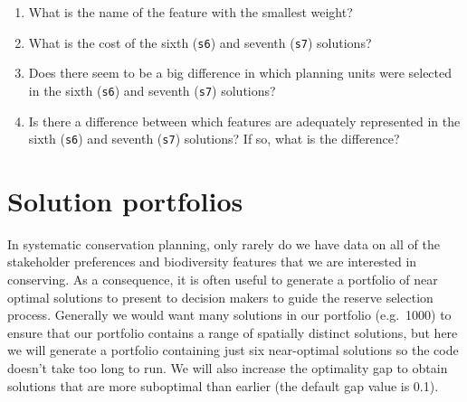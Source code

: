 \documentclass[12pt,]{book}
\makeatletter
\newenvironment{Shaded}{\begin{snugshade}}{\end{snugshade}}
\newcommand{\CommentTok}[1]{\textcolor[rgb]{0.56,0.35,0.01}{\textit{#1}}}
\newcommand{\DataTypeTok}[1]{\textcolor[rgb]{0.13,0.29,0.53}{#1}}
\newcommand{\DecValTok}[1]{\textcolor[rgb]{0.00,0.00,0.81}{#1}}
\newcommand{\FloatTok}[1]{\textcolor[rgb]{0.00,0.00,0.81}{#1}}
\newcommand{\KeywordTok}[1]{\textcolor[rgb]{0.13,0.29,0.53}{\textbf{#1}}}
\newcommand{\NormalTok}[1]{#1}
\newcommand{\OperatorTok}[1]{\textcolor[rgb]{0.81,0.36,0.00}{\textbf{#1}}}
\newcommand{\OtherTok}[1]{\textcolor[rgb]{0.56,0.35,0.01}{#1}}
\newcommand{\StringTok}[1]{\textcolor[rgb]{0.31,0.60,0.02}{#1}}
\providecommand{\tightlist}{%
  \setlength{\itemsep}{0pt}\setlength{\parskip}{0pt}}
\newenvironment{kframe}{%
\medskip{}
\setlength{\fboxsep}{.8em}
 \def\at@end@of@kframe{}%
 \ifinner\ifhmode%
  \def\at@end@of@kframe{\end{minipage}}%
  \begin{minipage}{\columnwidth}%
 \fi\fi%
 \def\FrameCommand##1{\hskip\@totalleftmargin \hskip-\fboxsep
 \colorbox{shadecolor}{##1}\hskip-\fboxsep
     \hskip-\linewidth \hskip-\@totalleftmargin \hskip\columnwidth}%
 \MakeFramed {\advance\hsize-\width
   \@totalleftmargin\z@ \linewidth\hsize
   \@setminipage}}%
 {\par\unskip\endMakeFramed%
 \at@end@of@kframe}
\newenvironment{rmdblock}[1]
  {
  \begin{itemize}
  \renewcommand{\labelitemi}{
    \raisebox{-.7\height}[0pt][0pt]{
      {\setkeys{Gin}{width=3em,keepaspectratio}\texttt{[image: images/\#1]}}
    }
  }
  \setlength{\fboxsep}{1em}
  \begin{kframe}
  \item
  }
  {
  \end{kframe}
  \end{itemize}
  }
\newenvironment{rmdquestion}
  {\begin{rmdblock}{question}}
  {\end{rmdblock}}
\makeatother
\begin{document}
\begin{rmdquestion}
\begin{enumerate}
\def\labelenumi{\arabic{enumi}.}
\tightlist
\item
  What is the name of the feature with the smallest weight?
\item
  What is the cost of the sixth (\texttt{s6}) and seventh (\texttt{s7}) solutions?
\item
  Does there seem to be a big difference in which planning units were selected in the sixth (\texttt{s6}) and seventh (\texttt{s7}) solutions?
\item
  Is there a difference between which features are adequately represented in the sixth (\texttt{s6}) and seventh (\texttt{s7}) solutions? If so, what is the difference?
\end{enumerate}
\end{rmdquestion}

\hypertarget{solution-portfolios}{%
\section{Solution portfolios}\label{solution-portfolios}}

In systematic conservation planning, only rarely do we have data on all of the stakeholder preferences and biodiversity features that we are interested in conserving. As a consequence, it is often useful to generate a portfolio of near optimal solutions to present to decision makers to guide the reserve selection process. Generally we would want many solutions in our portfolio (e.g.~1000) to ensure that our portfolio contains a range of spatially distinct solutions, but here we will generate a portfolio containing just six near-optimal solutions so the code doesn't take too long to run. We will also increase the optimality gap to obtain solutions that are more suboptimal than earlier (the default gap value is 0.1).

\begin{Shaded}
\end{Shaded}
\end{document}
